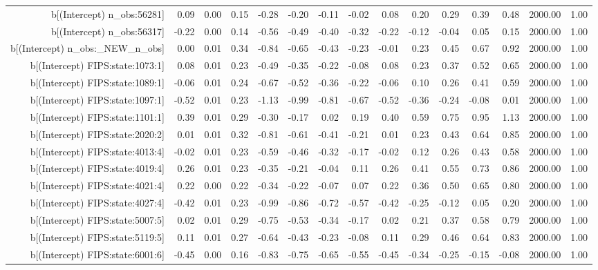 \begin{table}[ht]
\begin{tabular}{rrrrrrrrrrrrrrr}
  b[(Intercept) n\_obs:56281] & 0.09 & 0.00 & 0.15 & -0.28 & -0.20 & -0.11 & -0.02 & 0.08 & 0.20 & 0.29 & 0.39 & 0.48 & 2000.00 & 1.00 \\ 
  b[(Intercept) n\_obs:56317] & -0.22 & 0.00 & 0.14 & -0.56 & -0.49 & -0.40 & -0.32 & -0.22 & -0.12 & -0.04 & 0.05 & 0.15 & 2000.00 & 1.00 \\ 
  b[(Intercept) n\_obs:\_NEW\_n\_obs] & 0.00 & 0.01 & 0.34 & -0.84 & -0.65 & -0.43 & -0.23 & -0.01 & 0.23 & 0.45 & 0.67 & 0.92 & 2000.00 & 1.00 \\ 
  b[(Intercept) FIPS:state:1073:1] & 0.08 & 0.01 & 0.23 & -0.49 & -0.35 & -0.22 & -0.08 & 0.08 & 0.23 & 0.37 & 0.52 & 0.65 & 2000.00 & 1.00 \\ 
  b[(Intercept) FIPS:state:1089:1] & -0.06 & 0.01 & 0.24 & -0.67 & -0.52 & -0.36 & -0.22 & -0.06 & 0.10 & 0.26 & 0.41 & 0.59 & 2000.00 & 1.00 \\ 
  b[(Intercept) FIPS:state:1097:1] & -0.52 & 0.01 & 0.23 & -1.13 & -0.99 & -0.81 & -0.67 & -0.52 & -0.36 & -0.24 & -0.08 & 0.01 & 2000.00 & 1.00 \\ 
  b[(Intercept) FIPS:state:1101:1] & 0.39 & 0.01 & 0.29 & -0.30 & -0.17 & 0.02 & 0.19 & 0.40 & 0.59 & 0.75 & 0.95 & 1.13 & 2000.00 & 1.00 \\ 
  b[(Intercept) FIPS:state:2020:2] & 0.01 & 0.01 & 0.32 & -0.81 & -0.61 & -0.41 & -0.21 & 0.01 & 0.23 & 0.43 & 0.64 & 0.85 & 2000.00 & 1.00 \\ 
  b[(Intercept) FIPS:state:4013:4] & -0.02 & 0.01 & 0.23 & -0.59 & -0.46 & -0.32 & -0.17 & -0.02 & 0.12 & 0.26 & 0.43 & 0.58 & 2000.00 & 1.00 \\ 
  b[(Intercept) FIPS:state:4019:4] & 0.26 & 0.01 & 0.23 & -0.35 & -0.21 & -0.04 & 0.11 & 0.26 & 0.41 & 0.55 & 0.73 & 0.86 & 2000.00 & 1.00 \\ 
  b[(Intercept) FIPS:state:4021:4] & 0.22 & 0.00 & 0.22 & -0.34 & -0.22 & -0.07 & 0.07 & 0.22 & 0.36 & 0.50 & 0.65 & 0.80 & 2000.00 & 1.00 \\ 
  b[(Intercept) FIPS:state:4027:4] & -0.42 & 0.01 & 0.23 & -0.99 & -0.86 & -0.72 & -0.57 & -0.42 & -0.25 & -0.12 & 0.05 & 0.20 & 2000.00 & 1.00 \\ 
  b[(Intercept) FIPS:state:5007:5] & 0.02 & 0.01 & 0.29 & -0.75 & -0.53 & -0.34 & -0.17 & 0.02 & 0.21 & 0.37 & 0.58 & 0.79 & 2000.00 & 1.00 \\ 
  b[(Intercept) FIPS:state:5119:5] & 0.11 & 0.01 & 0.27 & -0.64 & -0.43 & -0.23 & -0.08 & 0.11 & 0.29 & 0.46 & 0.64 & 0.83 & 2000.00 & 1.00 \\ 
  b[(Intercept) FIPS:state:6001:6] & -0.45 & 0.00 & 0.16 & -0.83 & -0.75 & -0.65 & -0.55 & -0.45 & -0.34 & -0.25 & -0.15 & -0.08 & 2000.00 & 1.00 \\ 

\end{tabular}
\end{table}
